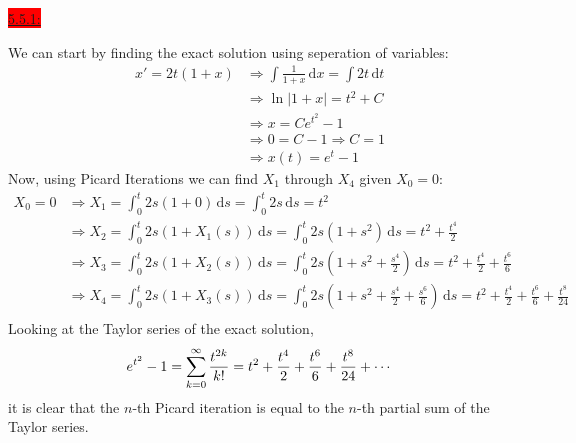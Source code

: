 \documentclass{exam}
\begin{document}
\colorbox{red}{\underline{5.5.1:}}
\begin{solution}
    We can start by finding the exact solution using seperation of variables:
    \begin{align*}
        x' = 2t(1+x) &\Rightarrow \int\frac{1}{1+x}\,\mathrm{d}x = \int 2t\,\mathrm{d}t \\
        &\Rightarrow \ln\left|1+x\right| = t^2 + C \\
        &\Rightarrow x = Ce^{t^2} - 1 \\
        &\Rightarrow 0 = C - 1 \Rightarrow C = 1 \\
        &\Rightarrow \boxed{x(t) = e^t - 1}
    \end{align*}
    Now, using Picard Iterations we can find $X_1$ through $X_4$ given $X_0 = 0$: 
    \begin{align*}
        X_0 = 0 &\Rightarrow X_1 = \int_{0}^{t}2s(1+0)\,\mathrm{d}s = \int_0^t 2s\,\mathrm{d}s = t^2 \\
        &\Rightarrow X_2 = \int_0^t 2s(1+X_1(s))\,\mathrm{d}s = \int_0^t 2s(1+s^2)\,\mathrm{d}s = t^2 + \frac{t^4}{2} \\
        &\Rightarrow X_3 = \int_0^t 2s(1+X_2(s))\,\mathrm{d}s = \int_0^t 2s\left(1+s^2 + \frac{s^4}{2}\right)\,\mathrm{d}s = t^2 + \frac{t^4}{2} + \frac{t^6}{6} \\
        &\Rightarrow X_4 = \int_0^t 2s(1+X_3(s))\,\mathrm{d}s = \int_0^t 2s\left(1+s^2 + \frac{s^4}{2} + \frac{s^6}{6}\right)\,\mathrm{d}s = t^2 + \frac{t^4}{2} + \frac{t^6}{6} + \frac{t^8}{24}\\
    \end{align*}
    Looking at the Taylor series of the exact solution, 
    \[
        e^{t^2} - 1 = \sum_{k=0}^{\infty} \frac{t^{2k}}{k\bf{!}} = t^2 + \frac{t^4}{2} + \frac{t^6}{6} + \frac{t^8}{24} + \cdots
    \]
    it is clear that the $n$-th Picard iteration is equal to the $n$-th partial sum of the Taylor series.
\end{solution}
\end{document}
